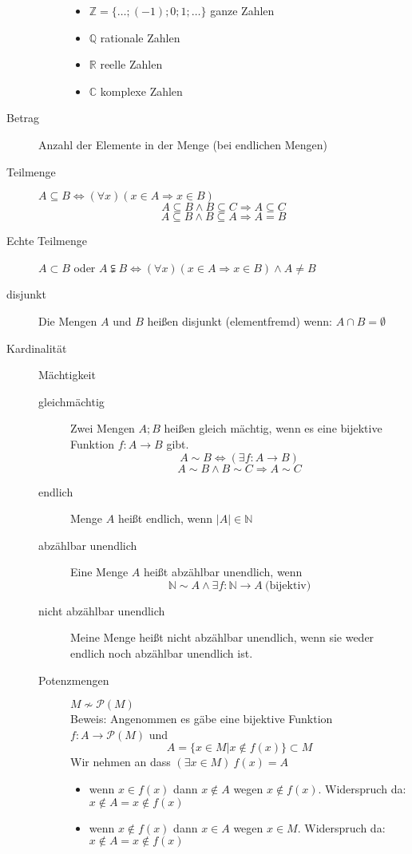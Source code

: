 \begin{description}
\begin{description}
\begin{itemize}
            \item $\mathbb{Z} = \lbrace \dots; (-1);0;1;\dots \rbrace$ ganze Zahlen
            \item $\mathbb{Q}$ rationale Zahlen
            \item $\mathbb{R}$ reelle Zahlen
            \item $\mathbb{C}$ komplexe Zahlen
        \end{itemize}
    \end{description}
    \item[Betrag] Anzahl der Elemente in der Menge (bei endlichen Mengen)
    \item[Teilmenge] $A \subseteq B \Leftrightarrow (\forall x)(x \in A \Rightarrow x \in B)$
    \[A \subseteq B \wedge B \subseteq C \Rightarrow A \subseteq C\]
    \[A \subseteq B \wedge B \subseteq A \Rightarrow A = B\]
    \item[Echte Teilmenge] $A \subset B$ oder $A \subsetneqq B \Leftrightarrow (\forall x)(x \in A \Rightarrow x \in B) \wedge A \not = B $
    \item[disjunkt] Die Mengen $A$ und $B$ heißen disjunkt (elementfremd) wenn: $A \cap B = \emptyset$
    \item[Kardinalität] Mächtigkeit
    \begin{description}
        \item[gleichmächtig] Zwei Mengen $A;B$ heißen gleich mächtig, wenn es eine bijektive Funktion $f : A \longrightarrow B$ gibt.
        \[A \sim B \Leftrightarrow (\exists f : A \longrightarrow B)\]
        \[A \sim B \wedge B \sim C \Rightarrow A \sim C\]
        \item[endlich] Menge $A$ heißt endlich, wenn $|A| \in \mathbb{N}$
        \item[abzählbar unendlich ] Eine Menge $A$ heißt abzählbar unendlich, wenn \[\mathbb{N} \sim A \wedge \exists f : \mathbb{N} \longrightarrow A\ \textrm{(bijektiv)}\]
        \item[nicht abzählbar unendlich] Meine Menge heißt nicht abzählbar unendlich, wenn sie weder endlich noch abzählbar unendlich ist.
        \item[Potenzmengen]$M \not \sim \mathcal{P}(M)$\\ Beweis:
        Angenommen es gäbe eine bijektive Funktion $f : A \longrightarrow \mathcal{P}(M)$ und
        \[A = \lbrace x \in M | x \not \in f(x) \rbrace \subset M\]
        Wir nehmen an dass $(\exists x \in M)\ f(x) = A$
        \begin{itemize}
            \item wenn $x \in f(x) $ dann $x \not \in A$ wegen $x \not \in f(x)$. Widerspruch da: $x \not \in A = x \not \in f(x)$
            \item wenn $x \not \in f(x)$ dann $x \in A$ wegen $x \in M$. Widerspruch da: $x \not \in A = x \not \in f(x)$
        \end{itemize}
    \end{description}
\end{description}
